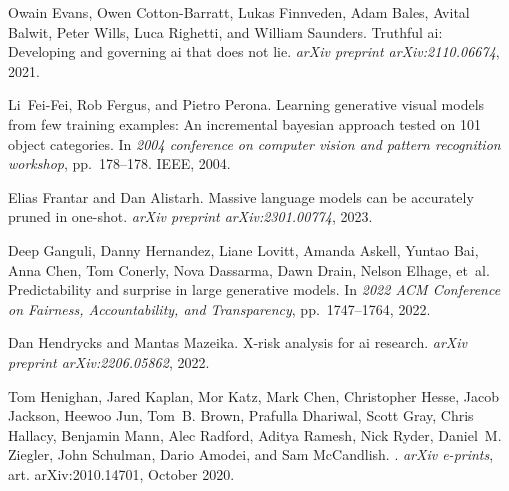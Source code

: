 \documentclass{article} %
\begin{document}
\begin{thebibliography}{62}
Owain Evans, Owen Cotton-Barratt, Lukas Finnveden, Adam Bales, Avital Balwit,
  Peter Wills, Luca Righetti, and William Saunders.
\newblock Truthful ai: Developing and governing ai that does not lie.
\newblock \emph{arXiv preprint arXiv:2110.06674}, 2021.

Li~Fei-Fei, Rob Fergus, and Pietro Perona.
\newblock Learning generative visual models from few training examples: An
  incremental bayesian approach tested on 101 object categories.
\newblock In \emph{2004 conference on computer vision and pattern recognition
  workshop}, pp.\  178--178. IEEE, 2004.

Elias Frantar and Dan Alistarh.
\newblock Massive language models can be accurately pruned in one-shot.
\newblock \emph{arXiv preprint arXiv:2301.00774}, 2023.

Deep Ganguli, Danny Hernandez, Liane Lovitt, Amanda Askell, Yuntao Bai, Anna
  Chen, Tom Conerly, Nova Dassarma, Dawn Drain, Nelson Elhage, et~al.
\newblock Predictability and surprise in large generative models.
\newblock In \emph{2022 ACM Conference on Fairness, Accountability, and
  Transparency}, pp.\  1747--1764, 2022.

Dan Hendrycks and Mantas Mazeika.
\newblock X-risk analysis for ai research.
\newblock \emph{arXiv preprint arXiv:2206.05862}, 2022.

Tom {Henighan}, Jared {Kaplan}, Mor {Katz}, Mark {Chen}, Christopher {Hesse},
  Jacob {Jackson}, Heewoo {Jun}, Tom~B. {Brown}, Prafulla {Dhariwal}, Scott
  {Gray}, Chris {Hallacy}, Benjamin {Mann}, Alec {Radford}, Aditya {Ramesh},
  Nick {Ryder}, Daniel~M. {Ziegler}, John {Schulman}, Dario {Amodei}, and Sam
  {McCandlish}.
.
\newblock \emph{arXiv e-prints}, art. arXiv:2010.14701, October 2020.


\end{thebibliography}
\end{document}
